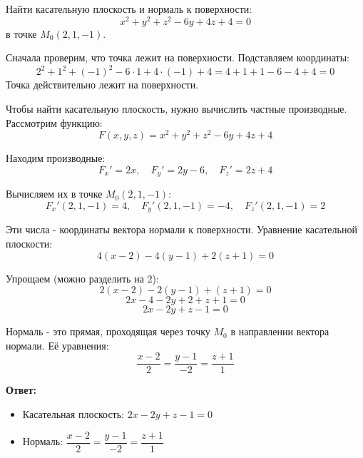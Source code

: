 \begin{problem}
Найти касательную плоскость и нормаль к поверхности:
\[ x^2 + y^2 + z^2 - 6y + 4z + 4 = 0 \]
в точке $M_0(2, 1, -1)$.
\end{problem}

\begin{solution}
Сначала проверим, что точка лежит на поверхности. Подставляем координаты:
\[ 2^2 + 1^2 + (-1)^2 - 6\cdot1 + 4\cdot(-1) + 4 = 4 + 1 + 1 - 6 - 4 + 4 = 0 \]
Точка действительно лежит на поверхности.

Чтобы найти касательную плоскость, нужно вычислить частные производные. Рассмотрим функцию:
\[ F(x,y,z) = x^2 + y^2 + z^2 - 6y + 4z + 4 \]

Находим производные:
\[ F_x' = 2x,\quad F_y' = 2y - 6,\quad F_z' = 2z + 4 \]

Вычисляем их в точке $M_0(2,1,-1)$:
\[ F_x'(2,1,-1) = 4,\quad F_y'(2,1,-1) = -4,\quad F_z'(2,1,-1) = 2 \]

Эти числа - координаты вектора нормали к поверхности. Уравнение касательной плоскости:
\[ 4(x-2) - 4(y-1) + 2(z+1) = 0 \]

Упрощаем (можно разделить на 2):
\[ 2(x-2) - 2(y-1) + (z+1) = 0 \]
\[ 2x - 4 - 2y + 2 + z + 1 = 0 \]
\[ 2x - 2y + z - 1 = 0 \]

Нормаль - это прямая, проходящая через точку $M_0$ в направлении вектора нормали. Её уравнения:
\[ \frac{x-2}{2} = \frac{y-1}{-2} = \frac{z+1}{1} \]

\textbf{Ответ:}
\begin{itemize}
    \item Касательная плоскость: $2x - 2y + z - 1 = 0$
    \item Нормаль: $\dfrac{x-2}{2} = \dfrac{y-1}{-2} = \dfrac{z+1}{1}$
\end{itemize}
\end{solution}